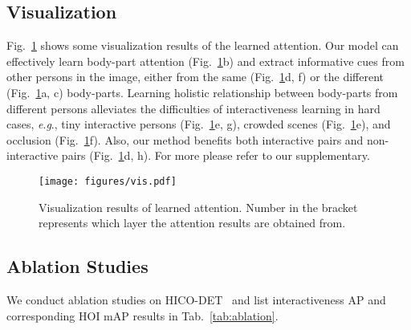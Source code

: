 \documentclass[runningheads]{llncs}
\newcommand{\eg}{\textit{e}.\textit{g}.}
\begin{document}
\begin{table}
\centering
{}
\caption{Results of ablation studies on HICO-DET~\cite{hicodet}.}
\label{tab:ablation}
\end{table}

\subsection{Visualization}\label{sec:vis}

Fig.~\ref{fig:vis} shows some visualization results of the learned attention. 
Our model can effectively learn body-part attention (Fig.~\ref{fig:vis}b) and extract informative cues from other persons in the image, either from the same (Fig.~\ref{fig:vis}d, f) or the different (Fig.~\ref{fig:vis}a, c) body-parts. Learning holistic relationship between body-parts from different persons alleviates the difficulties of interactiveness learning in hard cases, \eg, tiny interactive persons (Fig.~\ref{fig:vis}e, g), crowded scenes (Fig.~\ref{fig:vis}e), and occlusion (Fig.~\ref{fig:vis}f).
Also, our method benefits both interactive pairs and non-interactive pairs (Fig.~\ref{fig:vis}d, h). 
For more please refer to our supplementary.

\begin{figure}
\centering
\texttt{[image: figures/vis.pdf]}
\caption{Visualization results of learned attention. Number  in the bracket represents which layer the attention results are obtained from.}
\label{fig:vis}
\end{figure}

\subsection{Ablation Studies}\label{sec:ablation}
We conduct ablation studies on HICO-DET~\cite{hicodet} and list interactiveness AP and corresponding HOI mAP results in Tab.~\ref{tab:ablation}.
\end{document}
